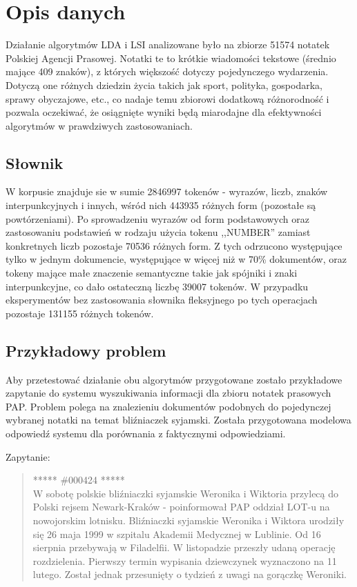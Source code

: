 \documentclass[11pt,a4paper]{article}
\begin{document}
\pagebreak

\section{Opis danych}
\label{sec:data}
\label{data-description}

Działanie algorytmów LDA i LSI analizowane było na zbiorze 51574 notatek
Polskiej Agencji Prasowej. Notatki te to krótkie wiadomości tekstowe (średnio
mające 409 znaków), z których większość dotyczy pojedynczego wydarzenia.
Dotyczą one różnych dziedzin życia takich jak sport, polityka, gospodarka,
sprawy obyczajowe, etc., co nadaje temu zbiorowi dodatkową różnorodność i
pozwala oczekiwać, że osiągnięte wyniki będą miarodajne dla efektywności
algorytmów w prawdziwych zastosowaniach.

\subsection{Słownik}

W korpusie znajduje sie w sumie 2846997 tokenów - wyrazów, liczb, znaków
interpunkcyjnych i innych, wśród nich 443935 różnych form (pozostałe są
powtórzeniami). Po sprowadzeniu wyrazów od form podstawowych oraz zastosowaniu
podstawień w rodzaju użycia tokenu ,,NUMBER'' zamiast konkretnych liczb
pozostaje 70536 różnych form. Z tych odrzucono występujące tylko w jednym
dokumencie, występujące w więcej niż w 70\% dokumentów, oraz tokeny mające małe
znaczenie semantyczne takie jak spójniki i znaki interpunkcyjne, co dało
ostateczną liczbę 39007 tokenów. W przypadku eksperymentów bez zastosowania
słownika fleksyjnego po tych operacjach pozostaje 131155 różnych tokenów.

\subsection{Przykładowy problem}
\label{sec:example}

Aby przetestować działanie obu algorytmów przygotowane zostało przykładowe
zapytanie do systemu wyszukiwania informacji dla zbioru notatek prasowych PAP.
Problem polega na znalezieniu dokumentów podobnych do pojedynczej wybranej
notatki na temat bliźniaczek syjamski. Została przygotowana modelowa odpowiedź
systemu dla porównania z faktycznymi odpowiedziami.

Zapytanie:

\begin{quote} ***** \#000424 *****\\ W sobotę polskie bliźniaczki syjamskie
Weronika i Wiktoria przylecą do Polski rejsem Newark-Kraków - poinformował PAP
oddział LOT-u na nowojorskim lotnisku.  Bliźniaczki syjamskie Weronika i
Wiktora urodziły się 26 maja 1999 w szpitalu Akademii Medycznej w Lublinie. Od
16 sierpnia przebywają w Filadelfii. W listopadzie przeszły udaną operację
rozdzielenia. Pierwszy termin wypisania dziewczynek wyznaczono na 11 lutego.
Został jednak przesunięty o tydzień z uwagi na gorączkę Weroniki.  \end{quote}
\end{document}
